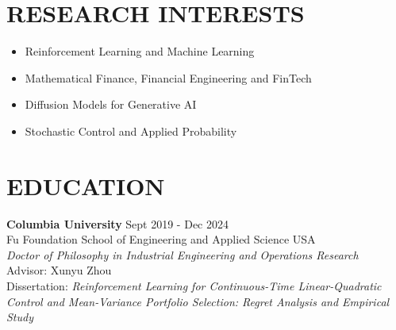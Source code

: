 \documentclass[margin, 10pt]{res} %
\begin{document}
\begin{resume}

 





\section{RESEARCH INTERESTS}

\begin{itemize}
    \item Reinforcement Learning and Machine Learning
    \item Mathematical Finance, Financial Engineering and FinTech
    \item Diffusion Models for Generative AI
    \item Stochastic Control and Applied Probability
\end{itemize}





\section{EDUCATION}

\textbf{Columbia University} \hfill Sept 2019 - Dec 2024\\
Fu Foundation School of Engineering and Applied Science \hfill USA\\
{\sl Doctor of Philosophy in Industrial Engineering and Operations Research }   \\
Advisor: Xunyu Zhou\\
Dissertation: {\sl Reinforcement Learning for Continuous-Time Linear-Quadratic Control and Mean-Variance Portfolio Selection: Regret Analysis and Empirical Study}


\end{resume}
\end{document}
